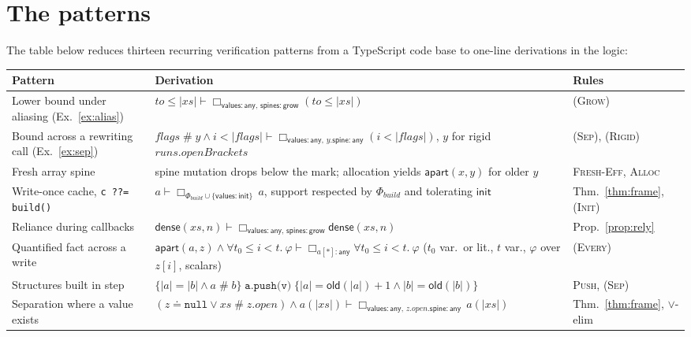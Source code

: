 \documentclass[10pt,a4paper]{article}
\theoremstyle{definition}
\theoremstyle{remark}
\newcommand{\bx}[1]{\Box_{#1}}
\newcommand{\sep}{\mathrel{\#}}
\newcommand{\kw}[1]{\mathsf{#1}}
\newcommand{\init}{\kw{init}}
\newcommand{\grow}{\kw{grow}}
\newcommand{\any}{\kw{any}}
\newcommand{\val}{\kw{values}}
\newcommand{\st}{\kw{spines}}
\newcommand{\old}{\kw{old}}
\newcommand{\dense}{\kw{dense}}
\newcommand{\apart}{\kw{apart}}
\newcommand{\len}[1]{|#1|}
\newcommand{\hoare}[3]{\{#1\}\;#2\;\{#3\}}
\newcommand{\code}[1]{\texttt{#1}}
\begin{document}
\section{The patterns}\label{sec:patterns}

The table below reduces thirteen recurring verification patterns from a
TypeScript code base to one-line derivations in the logic:

\begin{center}\small
\begin{tabularx}{\textwidth}{@{}>{\raggedright\arraybackslash}p{}>{\raggedright\arraybackslash}Xl@{}}
\toprule
Pattern & Derivation & Rules\\
\midrule
Lower bound under aliasing (Ex.~\ref{ex:alias}) & $\mathit{to}\le\len{\mathit{xs}}\vdash\bx{\val:\any,\,\st:\grow}(\mathit{to}\le\len{\mathit{xs}})$ & \textsc{(Grow)}\\[3pt]
Bound across a rewriting call (Ex.~\ref{ex:sep}) & $\mathit{flags}\sep y\wedge i<\len{\mathit{flags}}\vdash\bx{\val:\any,\,y.\kw{spine}:\any}(i<\len{\mathit{flags}})$, $y$ for rigid $\mathit{runs}.\mathit{openBrackets}$ & \textsc{(Sep)}, \textsc{(Rigid)}\\[3pt]
Fresh array spine & spine mutation drops below the mark; allocation yields $\apart(x,y)$ for older $y$ & \textsc{Fresh-Eff}, \textsc{Alloc}\\[3pt]
Write-once cache, \code{c ??= build()} & $a\vdash\bx{\Phi_{\mathit{build}}\cup\{\val:\init\}}\,a$, support respected by $\Phi_{\mathit{build}}$ and tolerating $\init$ & Thm.~\ref{thm:frame}, \textsc{(Init)}\\[3pt]
Reliance during callbacks & $\dense(\mathit{xs},n)\vdash\bx{\val:\any,\,\st:\grow}\dense(\mathit{xs},n)$ & Prop.~\ref{prop:rely}\\[3pt]
Quantified fact across a write & $\apart(a,z)\wedge\forall t_0\le i<t.\ \varphi\vdash\bx{a[\ast]:\any}\forall t_0\le i<t.\ \varphi$ ($t_0$ var.\ or lit., $t$ var., $\varphi$ over $z[i]$, scalars) & \textsc{(Every)}\\[3pt]
Structures built in step & $\hoare{\len a=\len b\wedge a\sep b}{\code{a.push(v)}}{\len a=\old(\len a)+1\wedge\len b=\old(\len b)}$ & \textsc{Push}, \textsc{(Sep)}\\[3pt]
Separation where a value exists & $(z\doteq\code{null}\vee\mathit{xs}\sep z.\mathit{open})\wedge a(\len{\mathit{xs}})\vdash\bx{\val:\any,\,z.\mathit{open}.\kw{spine}:\any}\,a(\len{\mathit{xs}})$ & Thm.~\ref{thm:frame}, $\vee$-elim\\[3pt]

\end{tabularx}
\end{center}
\end{document}
